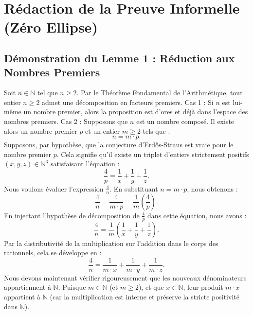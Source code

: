 \documentclass[12pt, a4paper]{article}
\begin{document}
\newpage

\section{Rédaction de la Preuve Informelle (Zéro Ellipse)}

\subsection{Démonstration du Lemme 1 : Réduction aux Nombres Premiers}
Soit $n \in \mathbb{N}$ tel que $n \ge 2$. Par le Théorème Fondamental de l'Arithmétique, tout entier $n \ge 2$ admet une décomposition en facteurs premiers.
Cas 1 : Si $n$ est lui-même un nombre premier, alors la proposition est d'ores et déjà dans l'espace des nombres premiers.
Cas 2 : Supposons que $n$ est un nombre composé. Il existe alors un nombre premier $p$ et un entier $m \ge 2$ tels que :
\begin{equation}
n = m \cdot p.
\end{equation}
Supposons, par hypothèse, que la conjecture d'Erd\H{o}s-Straus est vraie pour le nombre premier $p$. Cela signifie qu'il existe un triplet d'entiers strictement positifs $(x, y, z) \in \mathbb{N}^3$ satisfaisant l'équation :
\begin{equation}
\frac{4}{p} = \frac{1}{x} + \frac{1}{y} + \frac{1}{z}.
\end{equation}
Nous voulons évaluer l'expression $\frac{4}{n}$. En substituant $n = m \cdot p$, nous obtenons :
\begin{equation}
\frac{4}{n} = \frac{4}{m \cdot p} = \frac{1}{m} \left( \frac{4}{p} \right).
\end{equation}
En injectant l'hypothèse de décomposition de $\frac{4}{p}$ dans cette équation, nous avons :
\begin{equation}
\frac{4}{n} = \frac{1}{m} \left( \frac{1}{x} + \frac{1}{y} + \frac{1}{z} \right).
\end{equation}
Par la distributivité de la multiplication sur l'addition dans le corps des rationnels, cela se développe en :
\begin{equation}
\frac{4}{n} = \frac{1}{m \cdot x} + \frac{1}{m \cdot y} + \frac{1}{m \cdot z}.
\end{equation}
Nous devons maintenant vérifier rigoureusement que les nouveaux dénominateurs appartiennent à $\mathbb{N}$.
Puisque $m \in \mathbb{N}$ (et $m \ge 2$), et que $x \in \mathbb{N}$, leur produit $m \cdot x$ appartient à $\mathbb{N}$ (car la multiplication est interne et préserve la stricte positivité dans $\mathbb{N}$).
\end{document}
